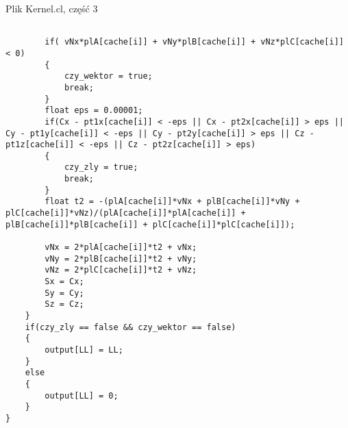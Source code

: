 \begin{program}
\caption{Plik Kernel.cl, część 3}
\begin{lstlisting}

        if( vNx*plA[cache[i]] + vNy*plB[cache[i]] + vNz*plC[cache[i]] < 0)
        {
            czy_wektor = true;
            break;
        }
        float eps = 0.00001;
        if(Cx - pt1x[cache[i]] < -eps || Cx - pt2x[cache[i]] > eps || Cy - pt1y[cache[i]] < -eps || Cy - pt2y[cache[i]] > eps || Cz - pt1z[cache[i]] < -eps || Cz - pt2z[cache[i]] > eps)
        {
            czy_zly = true;
            break;
        }
        float t2 = -(plA[cache[i]]*vNx + plB[cache[i]]*vNy + plC[cache[i]]*vNz)/(plA[cache[i]]*plA[cache[i]] + plB[cache[i]]*plB[cache[i]] + plC[cache[i]]*plC[cache[i]]);

        vNx = 2*plA[cache[i]]*t2 + vNx;
        vNy = 2*plB[cache[i]]*t2 + vNy;
        vNz = 2*plC[cache[i]]*t2 + vNz;
        Sx = Cx;
        Sy = Cy;
        Sz = Cz;
    }
    if(czy_zly == false && czy_wektor == false)
    {
        output[LL] = LL;
    }
    else
    {
        output[LL] = 0;
    }
}
\end{lstlisting}
\end{program}